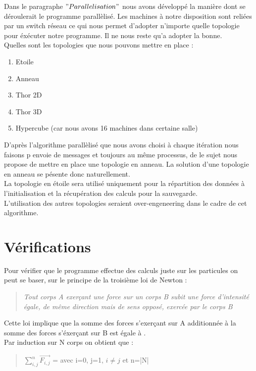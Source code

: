 \par Dans le paragraphe $"Parallelisation"$ nous avons développé la manière dont se déroulerait 
le programme parallèlisé. Les machines à notre disposition sont reliées par un switch 
réseau ce qui nous permet d'adopter n'importe quelle topologie pour éxécuter notre 
programme. Il ne nous reste qu'a adopter la bonne.\\
Quelles sont les topologies que nous pouvons mettre en place :
\begin{enumerate}
\item Etoile
\item Anneau
\item Thor 2D
\item Thor 3D
\item Hypercube (car nous avons 16 machines dans certaine salle)
\end{enumerate}

D'après l'algorithme parallèlisé que nous avons choisi à chaque itération nous faisons p
envoie de messages et toujours au même processus, de le sujet nous propose de mettre en
place une topologie en anneau. La solution d'une topologie en anneau se pésente donc
naturellement.\\
La topologie en étoile sera utilisé uniquement pour la répartition des données à 
l'initialisation et la récupération des calculs pour la sauvegarde.\\ 
L'utilisation des autres topologies seraient over-engeneering dans le cadre de cet
algorithme.

\section{Vérifications}

\par Pour vérifier que le programme effectue des calculs juste sur les particules on peut se baser, 
sur le principe de la troisième loi de Newton :
\begin{quote}
\textit{Tout corps A exerçant une force sur un corps B subit 
une force d'intensité égale, de même direction mais de sens opposé, exercée par le corps B}
\end{quote}

\par Cette loi implique que la somme des forces s'exerçant sur A additionnée à la somme des forces 
s'éxerçant sur B est égale à  .\\
Par induction sur N corps on obtient que :
\begin{quote}
  \begin{center}
    $\sum_{i,j}^{n} \overrightarrow{F_{i,j}}$ =  avec i=0, j=1, $i\not=j$ et n=|N| 
  \end{center}
\end{quote}

